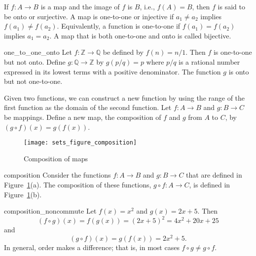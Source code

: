 If $f:A \rightarrow B$ is a map and the image of $f$ is $B$, i.e., $f(A) = B$, then $f$ is said to be {\bfi onto\/} or {\bfi surjective}.  A map is {\bfi one-to-one\/} or {\bfi injective\/} if $a_1 \neq a_2$ implies $f(a_1) \neq f(a_2)$.  Equivalently, a function is one-to-one if $f(a_1) = f(a_2)$ implies $a_1 = a_2$.  A map that is both one-to-one and onto is called {\bfi bijective}.



\begin{example}{one_to_one_onto}
Let $f:{\mathbb Z} \rightarrow {\mathbb Q}$ be defined by $f(n) = n/1$.  Then $f$ is one-to-one but not onto.  Define $g : {\mathbb Q} \rightarrow {\mathbb Z}$ by $g(p/q) = p$ where $p/q$ is a rational number expressed in its lowest terms with a positive denominator.  The function $g$ is onto but not one-to-one. 
\end{example}

Given two functions, we can construct a new function by using the range of the first function as the domain of the second function.  Let $f : A \rightarrow B$ and $g : B \rightarrow C$ be mappings.  Define a new map, the {\bfi composition\/} of $f$ and $g$ from $A$ to $C$, by $(g \circ f)(x) = g(f(x))$.

\begin{figure}[htb]
\begin{center}
\centerline {
\texttt{[image: sets\_figure\_composition]}
}
\end{center}
\label{sets_figure_composition}
\caption{Composition of maps}
\end{figure}
 

 
\begin{example}{composition}
Consider the functions $f: A \rightarrow B$ and $g: B \rightarrow C$ that are defined in Figure~\ref{sets_figure_composition}(a).  The composition of these functions, $g \circ f: A \rightarrow C$, is defined in
Figure~\ref{sets_figure_composition}(b). 
\end{example}

\begin{example}{composition_noncommute}
Let $f(x) = x^2$ and $g(x) = 2x + 5$. Then
$$
(f \circ g)(x) = f(g(x)) = (2x + 5)^2 = 4x^2 + 20x + 25 
$$
and
$$
(g \circ f)(x) = g(f(x)) = 2x^2 + 5.
$$
In general, order makes a difference; that is, in most cases $f \circ g \neq g \circ f$. 
\end{example}
 
